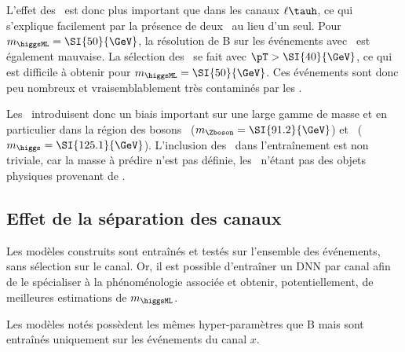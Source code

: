 L'effet des \ftauhs\ est donc plus important que dans les canaux $\ell\tauh$,
ce qui s'explique facilement par la présence de deux \tauh\ au lieu d'un seul.
Pour $m_{\higgsML}=\SI{50}{\GeV}$, la résolution de B sur les événements avec \DEEPTAU\ est également mauvaise.
La sélection des \tauh\ se fait avec $\pT>\SI{40}{\GeV}$, ce qui est difficile à obtenir pour $m_{\higgsML}=\SI{50}{\GeV}$.
Ces événements sont donc peu nombreux et vraisemblablement très contaminés par les \ftauhs.
\par
Les \ftauhs\ introduisent donc un biais important sur une large gamme de masse
et en particulier dans la région des bosons
\Zboson\ ($m_{\Zboson}=\SI{91.2}{\GeV}$)
et
\higgs\ ($m_{\higgs}=\SI{125.1}{\GeV}$).
L'inclusion des \ftauhs\ dans l'entraînement est non triviale, car la masse à prédire n'est pas définie,
les \ftauhs\ n'étant pas des objets physiques provenant de \higgsML.
\subsection{Effet de la séparation des canaux}
\def\Bchsplit#1{\ifthenelse{\equal{#1}{x}}{$\text{B}^{#1}$}{$\text{B}^\text{\GetChannelStr{#1}}$}}
Les modèles construits sont entraînés et testés sur l'ensemble des événements, sans sélection sur le canal.
Or,
il est possible d'entraîner un DNN par canal afin de le spécialiser à la phénoménologie associée
et obtenir, potentiellement, de meilleures estimations de $m_{\higgsML}$.
\par
Les modèles notés \Bchsplit{x} possèdent les mêmes hyper-paramètres que B mais sont entraînés uniquement sur les événements du canal $x$.
